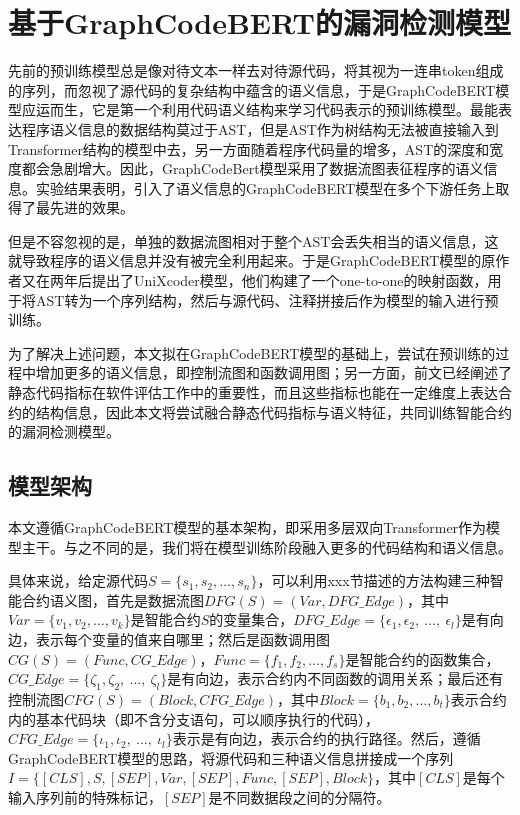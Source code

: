 \section{基于GraphCodeBERT的漏洞检测模型}
\label{sec:基于GraphCodeBERT的漏洞检测模型}
先前的预训练模型总是像对待文本一样去对待源代码，将其视为一连串token组成的序列，而忽视了源代码的复杂结构中蕴含的语义信息，于是GraphCodeBERT模型应运而生，它是第一个利用代码语义结构来学习代码表示的预训练模型\cite{guo2020graphcodebert}。最能表达程序语义信息的数据结构莫过于AST，但是AST作为树结构无法被直接输入到Transformer结构的模型中去，另一方面随着程序代码量的增多，AST的深度和宽度都会急剧增大。因此，GraphCodeBert模型采用了数据流图表征程序的语义信息。实验结果表明，引入了语义信息的GraphCodeBERT模型在多个下游任务上取得了最先进的效果。

但是不容忽视的是，单独的数据流图相对于整个AST会丢失相当的语义信息，这就导致程序的语义信息并没有被完全利用起来。于是GraphCodeBERT模型的原作者又在两年后提出了UniXcoder模型\cite{unixcoder}，他们构建了一个one-to-one的映射函数，用于将AST转为一个序列结构，然后与源代码、注释拼接后作为模型的输入进行预训练。

为了解决上述问题，本文拟在GraphCodeBERT模型的基础上，尝试在预训练的过程中增加更多的语义信息，即控制流图和函数调用图；另一方面，前文已经阐述了静态代码指标在软件评估工作中的重要性，而且这些指标也能在一定维度上表达合约的结构信息，因此本文将尝试融合静态代码指标与语义特征，共同训练智能合约的漏洞检测模型。

\subsection{模型架构}
\label{sec:模型架构}
本文遵循GraphCodeBERT模型的基本架构，即采用多层双向Transformer作为模型主干。与之不同的是，我们将在模型训练阶段融入更多的代码结构和语义信息。

具体来说，给定源代码$S=\{s_{1},s_{2},...,s_{n}\}$，可以利用xxx节描述的方法构建三种智能合约语义图，首先是数据流图$DFG(S)=(Var,DFG\_Edge)$，其中$Var=\{v_1,v_2,\ldots,v_k\}$是智能合约$S$的变量集合，$DFG\_Edge=\{\epsilon_1,\epsilon_2,~\ldots,~\epsilon_l\}$是有向边，表示每个变量的值来自哪里；然后是函数调用图$CG(S)=(Func,CG\_Edge)$，$Func=\{f_1,f_2,\ldots,f_s\}$是智能合约的函数集合，$CG\_Edge=\{\zeta_1,\zeta_2,~\ldots,~\zeta_l\}$是有向边，表示合约内不同函数的调用关系；最后还有控制流图$CFG(S)=(Block,CFG\_Edge)$，其中$Block=\{b_1,b_2,\ldots,b_t\}$表示合约内的基本代码块（即不含分支语句，可以顺序执行的代码），$CFG\_Edge=\{\iota_1,\iota_2,~\ldots,~\iota_l\}$表示是有向边，表示合约的执行路径。然后，遵循GraphCodeBERT模型的思路，将源代码和三种语义信息拼接成一个序列$I=\{[CLS],S,[SEP],Var,[SEP],Func,[SEP],Block\}$，其中$[CLS]$是每个输入序列前的特殊标记，$[SEP]$是不同数据段之间的分隔符。


